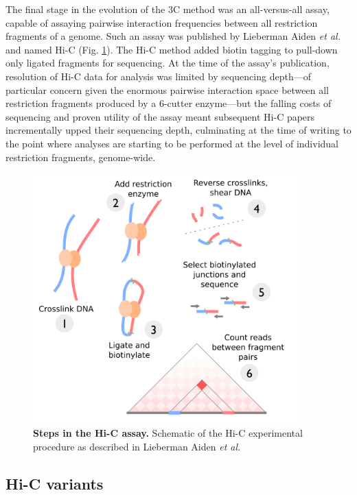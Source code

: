 \documentclass[a4paper,11pt,oneside]{book}
\begin{document}
The final stage in the evolution of the 3C method was an all-versus-all assay, capable of assaying pairwise interaction frequencies between all restriction fragments of a genome. Such an assay was published by Lieberman Aiden \emph{et al.}\cite{Lieberman2009} and named Hi-C (Fig. \ref{fig:hicmethod}). The Hi-C method added biotin tagging to pull-down only ligated fragments for sequencing. At the time of the assay's publication, resolution of Hi-C data for analysis was limited by sequencing depth---of particular concern given the enormous pairwise interaction space between all restriction fragments produced by a 6-cutter enzyme---but the falling costs of sequencing and proven utility of the assay meant subsequent Hi-C papers incrementally upped their sequencing depth, culminating at the time of writing to the point where analyses are starting to be performed at the level of individual restriction fragments, genome-wide.\cite{Dixon2012,  Selvaraj2013a, Jin2013, Rao2014}

\begin{figure}
\begin{center}
\includegraphics[width=4in]{figs/hic.png}
\captionsetup{width=\textwidth}
\caption[Steps in the Hi-C assay.]{ {\bf Steps in the Hi-C assay. } 
  Schematic of the Hi-C experimental procedure as described in Lieberman Aiden \emph{et al.}\cite{Lieberman2009}
}\label{fig:hicmethod}
\end{center}
\end{figure} 

\subsection{Hi-C variants}\label{sec:hicvar}
\end{document}
